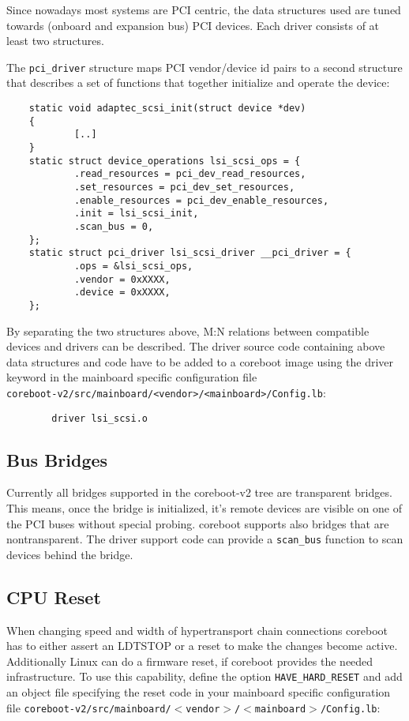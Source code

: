 \documentclass[titlepage,12pt]{article}
\begin{document}
Since nowadays most systems are PCI centric, the data structures used
are tuned towards (onboard and expansion bus) PCI devices. Each driver
consists of at least two structures.

The \texttt{pci\_driver} structure maps PCI vendor/device id pairs to a
second structure that describes a set of functions that together
initialize and operate the device:

\begin{verbatim}
    static void adaptec_scsi_init(struct device *dev)
    {
            [..]
    }
    static struct device_operations lsi_scsi_ops = {
            .read_resources = pci_dev_read_resources,
            .set_resources = pci_dev_set_resources,
            .enable_resources = pci_dev_enable_resources,
            .init = lsi_scsi_init,
            .scan_bus = 0,
    };
    static struct pci_driver lsi_scsi_driver __pci_driver = {
            .ops = &lsi_scsi_ops,
            .vendor = 0xXXXX,
            .device = 0xXXXX,
    };
\end{verbatim}

By separating the two structures above, M:N relations between compatible
devices and drivers can be described. The driver source code containing
above data structures and code have to be added to a coreboot image
using the driver keyword in the mainboard specific configuration file \\
\texttt{coreboot-v2/src/mainboard/<vendor>/<mainboard>/Config.lb}:

\begin{verbatim}
        driver lsi_scsi.o
\end{verbatim}

\subsection{Bus Bridges}

Currently all bridges supported in the coreboot-v2 tree are transparent
bridges. This means, once the bridge is initialized, it's remote devices
are visible on one of the PCI buses without special probing. coreboot
supports also bridges that are nontransparent.  The driver support code
can provide a \texttt{scan\_bus} function to scan devices behind the bridge.

\subsection{CPU Reset}
When changing speed and width of hypertransport chain connections
coreboot has to either assert an LDTSTOP or a reset to make the changes
become active.  Additionally Linux can do a firmware reset, if coreboot
provides the needed infrastructure. To use this capability, define the
option \texttt{HAVE\_HARD\CONFIG_RESET} and add an object file specifying the
reset code in your mainboard specific configuration file
\texttt{coreboot-v2/src/mainboard/$<$vendor$>$/$<$mainboard$>$/Config.lb}:
\end{document}
